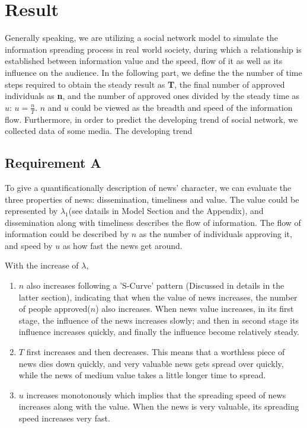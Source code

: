 \section{Result}
Generally speaking, we are utilizing a social network model to simulate the information spreading process in real world society, during which a relationship is established between information value and the speed, flow of it as well as its influence on the audience.  
In the following part, we define the the number of time steps required to obtain the steady result as \textbf{T}, the final number of approved individuals as \textbf{n}, and the number of approved ones divided by the steady time as $u$: $u=\frac{n}{T}$. $n$ and $u$ could be viewed as the breadth and speed of the information flow. 
Furthermore, in order to predict the developing trend of social network, we collected data of some media. The developing trend 
\subsection{Requirement A}
To give a quantificationally description of news' character, we can evaluate the three properties of news\cite{stephens2007history}: dissemination, timeliness and value. The value could be represented by $\lambda_1$(see datails in Model Section and the Appendix), and dissemination along with timeliness describes the flow of information. The flow of information could be described by $n$ as the number of individuals approving it, and speed by $u$ as how fast the news get around.  

With the increase of $\lambda$, 
\begin{enumerate}
	\item $n$ also increases following a 'S-Curve' pattern (Discussed in details in the latter section), indicating that when the value of news increases, the number of people approved($n$) also increases. When news value increases, in its first stage, the influence of the news increases slowly; and then in second stage its influence increases quickly, and finally the influence become relatively steady.
	\item $T$ first increases and then decreases. This means that a worthless piece of news dies down quickly, and very valuable news gets spread over quickly, while the news of medium value takes a little longer time to spread.
	\item $u$ increases monotonously which implies that the spreading speed of news increases along with the value. When the news is very valuable, its spreading speed increases very fast.
\end{enumerate}

